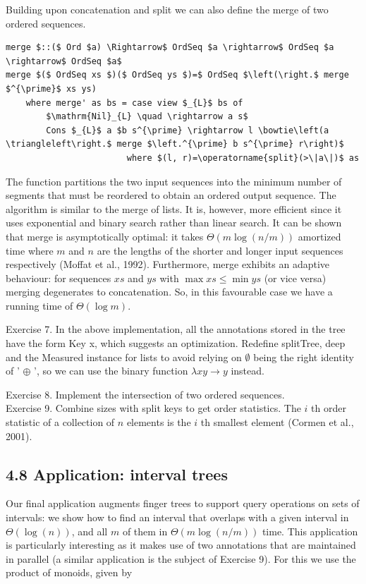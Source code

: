 \documentclass[10pt]{article}
\begin{document}
Building upon concatenation and split we can also define the merge of two ordered sequences.

\begin{verbatim}
merge $::($ Ord $a) \Rightarrow$ OrdSeq $a \rightarrow$ OrdSeq $a \rightarrow$ OrdSeq $a$
merge $($ OrdSeq xs $)($ OrdSeq ys $)=$ OrdSeq $\left(\right.$ merge $^{\prime}$ xs ys)
    where merge' as bs = case view $_{L}$ bs of
        $\mathrm{Nil}_{L} \quad \rightarrow a s$
        Cons $_{L}$ a $b s^{\prime} \rightarrow l \bowtie\left(a \triangleleft\right.$ merge $\left.^{\prime} b s^{\prime} r\right)$
                        where $(l, r)=\operatorname{split}(>\|a\|)$ as
\end{verbatim}

The function partitions the two input sequences into the minimum number of segments that must be reordered to obtain an ordered output sequence. The algorithm is similar to the merge of lists. It is, however, more efficient since it uses exponential and binary search rather than linear search. It can be shown that merge is asymptotically optimal: it takes $\Theta(m \log (n / m))$ amortized time where $m$ and $n$ are the lengths of the shorter and longer input sequences respectively (Moffat et al., 1992). Furthermore, merge exhibits an adaptive behaviour: for sequences $x s$ and $y s$ with $\max x s \leqslant \min y s$ (or vice versa) merging degenerates to concatenation. So, in this favourable case we have a running time of $\Theta(\log m)$.

Exercise 7. In the above implementation, all the annotations stored in the tree have the form Key x, which suggests an optimization. Redefine splitTree, deep and the Measured instance for lists to avoid relying on $\emptyset$ being the right identity of ' $\oplus$ ', so we can use the binary function $\lambda x y \rightarrow y$ instead.

Exercise 8. Implement the intersection of two ordered sequences.\\
Exercise 9. Combine sizes with split keys to get order statistics. The $i$ th order statistic of a collection of $n$ elements is the $i$ th smallest element (Cormen et al., 2001).

\subsection*{4.8 Application: interval trees}
Our final application augments finger trees to support query operations on sets of intervals: we show how to find an interval that overlaps with a given interval in $\Theta(\log (n))$, and all $m$ of them in $\Theta(m \log (n / m))$ time. This application is particularly interesting as it makes use of two annotations that are maintained in parallel (a similar application is the subject of Exercise 9). For this we use the product of monoids, given by
\end{document}
